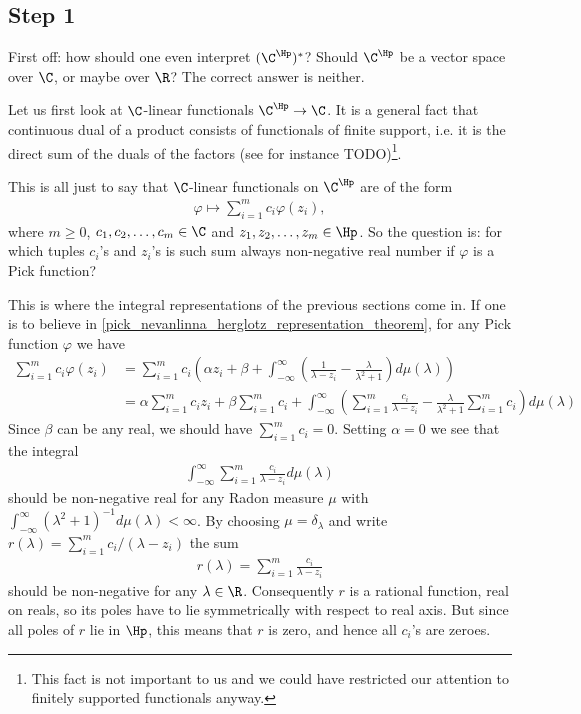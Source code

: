 \subsection{Step 1}

First off: how should one even interpret $(\C^{\Hp})^{*}$? Should $\C^{\Hp}$ be a vector space over $\C$, or maybe over $\R$? The correct answer is neither.

Let us first look at $\C$-linear functionals $\C^{\Hp} \to \C$. It is a general fact that continuous dual of a product consists of functionals of finite support, i.e. it is the direct sum of the duals of the factors (see for instance TODO)\footnote{This fact is not important to us and we could have restricted our attention to finitely supported functionals anyway.}.

This is all just to say that $\C$-linear functionals on $\C^{\Hp}$ are of the form
\begin{align*}
	\varphi \mapsto \sum_{i = 1}^{m} c_{i} \varphi(z_{i}),
\end{align*}
where $m \geq 0$, $c_{1}, c_{2}, \ldots, c_{m} \in \C$ and $z_{1}, z_{2}, \ldots, z_{m} \in \Hp$. So the question is: for which tuples $c_{i}$'s and $z_{i}$'s is such sum always non-negative real number if $\varphi$ is a Pick function?

This is where the integral representations of the previous sections come in. If one is to believe in \ref{pick_nevanlinna_herglotz_representation_theorem}, for any Pick function $\varphi$ we have
\begin{align*}
	\sum_{i = 1}^{m} c_{i} \varphi(z_{i}) &= \sum_{i = 1}^{m} c_{i} \left(\alpha z_{i} + \beta + \int_{-\infty}^{\infty} \left(\frac{1}{\lambda - z_{i}} - \frac{\lambda}{\lambda^2 + 1}\right) d \mu(\lambda)\right) \\
	&= \alpha \sum_{i = 1}^{m} c_{i} z_{i} + \beta \sum_{i = 1}^{m} c_{i} + \int_{-\infty}^{\infty} \left( \sum_{i = 1}^{m}\frac{c_{i}}{\lambda - z_{i}} - \frac{\lambda}{\lambda^2 + 1} \sum_{i = 1}^{m} c_{i} \right) d \mu(\lambda)
\end{align*}
Since $\beta$ can be any real, we should have $\sum_{i = 1}^{m} c_{i} = 0$. Setting $\alpha = 0$ we see that the integral
\begin{align*}
	 \int_{-\infty}^{\infty} \sum_{i = 1}^{m}\frac{c_{i}}{\lambda - z_{i}} d \mu(\lambda)
\end{align*}
should be non-negative real for any Radon measure $\mu$ with $\int_{-\infty}^{\infty} (\lambda^2 + 1)^{-1} d \mu(\lambda) < \infty$. By choosing $\mu = \delta_{\lambda}$ and write $r(\lambda) =  \sum_{i = 1}^{m} c_{i}/(\lambda - z_{i})$ the sum
\begin{align*}
	r(\lambda) = \sum_{i = 1}^{m}\frac{c_{i}}{\lambda - z_{i}}
\end{align*}
should be non-negative for any $\lambda \in \R$. Consequently $r$ is a rational function, real on reals, so its poles have to lie symmetrically with respect to real axis. But since all poles of $r$ lie in $\Hp$, this means that $r$ is zero, and hence all $c_{i}$'s are zeroes.

